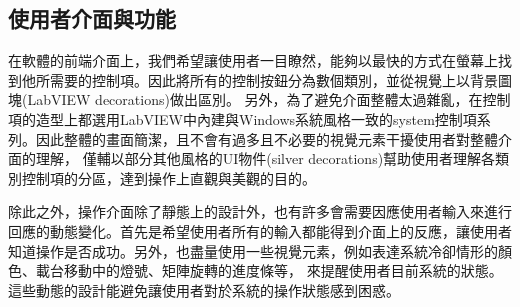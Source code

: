 \documentclass[12pt]{article}
\begin{document}
\subsection{使用者介面與功能}
在軟體的前端介面上，我們希望讓使用者一目瞭然，能夠以最快的方式在螢幕上找到他所需要的控制項。因此將所有的控制按鈕分為數個類別，並從視覺上以背景圖塊(LabVIEW decorations)做出區別。
另外，為了避免介面整體太過雜亂，在控制項的造型上都選用LabVIEW中內建與Windows系統風格一致的system控制項系列。因此整體的畫面簡潔，且不會有過多且不必要的視覺元素干擾使用者對整體介面的理解，
僅輔以部分其他風格的UI物件(silver decorations)幫助使用者理解各類別控制項的分區，達到操作上直觀與美觀的目的。

除此之外，操作介面除了靜態上的設計外，也有許多會需要因應使用者輸入來進行回應的動態變化。首先是希望使用者所有的輸入都能得到介面上的反應，讓使用者知道操作是否成功。另外，也盡量使用一些視覺元素，例如表達系統冷卻情形的顏色、載台移動中的燈號、矩陣旋轉的進度條等，
來提醒使用者目前系統的狀態。這些動態的設計能避免讓使用者對於系統的操作狀態感到困惑。
\end{document}
